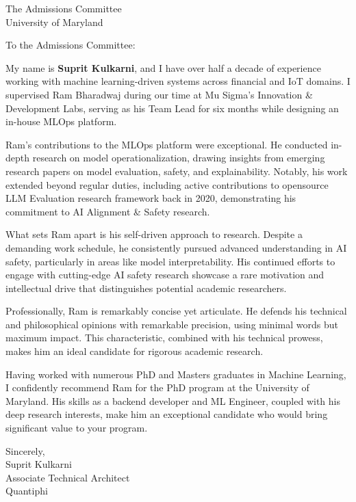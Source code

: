 \documentclass[11pt]{letter}
\begin{document}
\begin{letter}{The Admissions Committee \\ University of Maryland}
\opening{To the Admissions Committee:}

My name is \textbf{Suprit Kulkarni}, and I have over half a decade of experience working with machine learning-driven systems across financial and IoT domains. I supervised Ram Bharadwaj during our time at Mu Sigma's Innovation \& Development Labs, serving as his Team Lead for six months while designing an in-house MLOps platform.

Ram's contributions to the MLOps platform were exceptional. He conducted in-depth research on model operationalization, drawing insights from emerging research papers on model evaluation, safety, and explainability. Notably, his work extended beyond regular duties, including active contributions to opensource LLM Evaluation research framework back in 2020, demonstrating his commitment to AI Alignment \& Safety research.

What sets Ram apart is his self-driven approach to research. Despite a demanding work schedule, he consistently pursued advanced understanding in AI safety, particularly in areas like model interpretability. His continued efforts to engage with cutting-edge AI safety research showcase a rare motivation and intellectual drive that distinguishes potential academic researchers.

Professionally, Ram is remarkably concise yet articulate. He defends his technical and philosophical opinions with remarkable precision, using minimal words but maximum impact. This characteristic, combined with his technical prowess, makes him an ideal candidate for rigorous academic research.

Having worked with numerous PhD and Masters graduates in Machine Learning, I confidently recommend Ram for the PhD program at the University of Maryland. His skills as a backend developer and ML Engineer, coupled with his deep research interests, make him an exceptional candidate who would bring significant value to your program.

\closing{Sincerely,\\[4pt]
Suprit Kulkarni\\
Associate Technical Architect\\
Quantiphi}

\end{letter}
\end{document}
